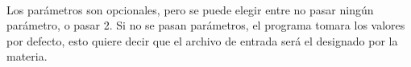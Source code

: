 \paragraph{}
Los parámetros son opcionales, pero se puede elegir entre no pasar ningún parámetro, o pasar 2. Si no se pasan parámetros, el programa tomara los valores por defecto, esto quiere decir que el archivo de entrada será el designado por la materia.


